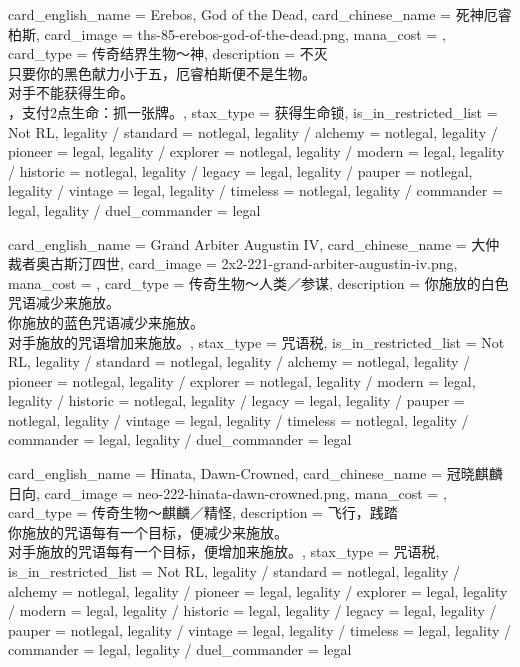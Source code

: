 \documentclass[lang = cn, color = black, 10pt]{AllThatStax}
\begin{document}
\card
{
	card_english_name = {Erebos, God of the Dead},
	card_chinese_name = {死神厄睿柏斯},
	card_image = ths-85-erebos-god-of-the-dead.png,
	mana_cost = ,
	card_type = 传奇结界生物～神,
	description = {不灭\\
只要你的黑色献力小于五，厄睿柏斯便不是生物。\\
对手不能获得生命。\\
，支付2点生命：抓一张牌。},
	stax_type = 获得生命锁,
	is_in_restricted_list = Not RL,
	legality / standard = notlegal,
	legality / alchemy = notlegal,
	legality / pioneer = legal,
	legality / explorer = notlegal,
	legality / modern = legal,
	legality / historic = notlegal,
	legality / legacy = legal,
	legality / pauper = notlegal,
	legality / vintage = legal,
	legality / timeless = notlegal,
	legality / commander = legal,
	legality / duel_commander = legal
}

\card
{
	card_english_name = {Grand Arbiter Augustin IV},
	card_chinese_name = {大仲裁者奥古斯汀四世},
	card_image = 2x2-221-grand-arbiter-augustin-iv.png,
	mana_cost = ,
	card_type = 传奇生物～人类／参谋,
	description = {你施放的白色咒语减少来施放。\\
你施放的蓝色咒语减少来施放。\\
对手施放的咒语增加来施放。},
	stax_type = 咒语税,
	is_in_restricted_list = Not RL,
	legality / standard = notlegal,
	legality / alchemy = notlegal,
	legality / pioneer = notlegal,
	legality / explorer = notlegal,
	legality / modern = legal,
	legality / historic = notlegal,
	legality / legacy = legal,
	legality / pauper = notlegal,
	legality / vintage = legal,
	legality / timeless = notlegal,
	legality / commander = legal,
	legality / duel_commander = legal
}

\card
{
	card_english_name = {Hinata, Dawn-Crowned},
	card_chinese_name = {冠晓麒麟日向},
	card_image = neo-222-hinata-dawn-crowned.png,
	mana_cost = ,
	card_type = 传奇生物～麒麟／精怪,
	description = {飞行，践踏\\
你施放的咒语每有一个目标，便减少来施放。\\
对手施放的咒语每有一个目标，便增加来施放。},
	stax_type = 咒语税,
	is_in_restricted_list = Not RL,
	legality / standard = notlegal,
	legality / alchemy = notlegal,
	legality / pioneer = legal,
	legality / explorer = legal,
	legality / modern = legal,
	legality / historic = legal,
	legality / legacy = legal,
	legality / pauper = notlegal,
	legality / vintage = legal,
	legality / timeless = legal,
	legality / commander = legal,
	legality / duel_commander = legal
}
\end{document}
